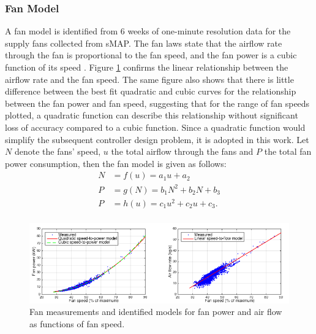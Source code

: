 \subsubsection{Fan Model}

A fan model is identified from 6 weeks of one-minute resolution data for the supply fans collected from sMAP.
The fan laws state that the airflow rate through the fan is proportional to the fan speed, and the fan power is a cubic function of its speed \cite{Hvac_book}. 
Figure \ref{fig:fan_model} confirms the linear relationship between the airflow rate and the fan speed. 
The same figure also shows that there is little difference between the best fit quadratic and cubic curves for the relationship between the fan power and fan speed, suggesting that for the range of fan speeds plotted, a quadratic function can describe this relationship without significant loss of accuracy compared to a cubic function. %
Since a quadratic function would simplify the subsequent controller design problem, it is adopted in this work. 
Let $N$ denote the fans' speed, $u$ the total airflow through the fans and $P$ the total fan power consumption, then the fan model is given as follows:
\begin{equation}\label{eq:fan_model}
\begin{aligned}
N & = f(u) = a_1 u + a_2\\
P & = g(N) = b_1 N^2 + b_2 N + b_3\\
P & = h(u) = c_1 u^2 + c_2 u + c_3.\\
\end{aligned}
\end{equation} 

\begin{figure}[t]
\centering
\includegraphics[scale=0.33]{chapters/building_exp/figures/fan_model.png}
\caption{Fan measurements and identified models for fan power and air flow as functions of fan speed.}
\label{fig:fan_model}
\vspace*{-0.15cm}
\end{figure}








